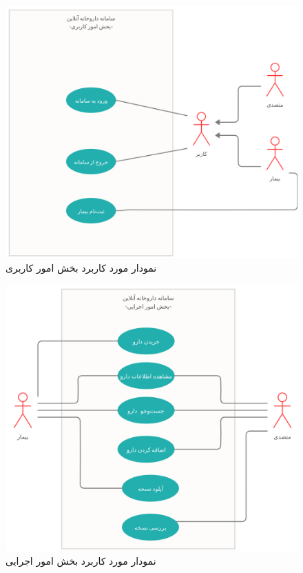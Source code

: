 \begin{itemize}
	\begin{figure}
		\begin{center}
			\includegraphics[scale=0.3]{./7-1.png}
			\caption{نمودار مورد کاربرد بخش امور کاربری}
		\end{center}
	\end{figure}
	\begin{figure}
		\begin{center}
			\includegraphics[scale=0.3]{./7-2.png}
			\caption{نمودار مورد کاربرد بخش امور اجرایی}
		\end{center}
	\end{figure}
\end{itemize}
